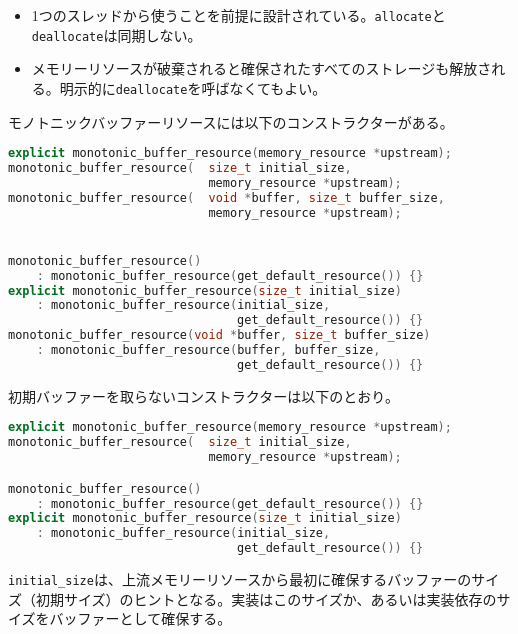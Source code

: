 \begin{itemize}[leftmargin=*]
\item
  1つのスレッドから使うことを前提に設計されている。\lstinline!allocate!と\lstinline!deallocate!は同期しない。
\item
  メモリーリソースが破棄されると確保されたすべてのストレージも解放される。明示的に\lstinline!deallocate!を呼ばなくてもよい。
\end{itemize}

%

モノトニックバッファーリソースには以下のコンストラクターがある。

\begin{lstlisting}[language=C++]
explicit monotonic_buffer_resource(memory_resource *upstream);
monotonic_buffer_resource(  size_t initial_size,
                            memory_resource *upstream);
monotonic_buffer_resource(  void *buffer, size_t buffer_size,
                            memory_resource *upstream);


monotonic_buffer_resource()
    : monotonic_buffer_resource(get_default_resource()) {}
explicit monotonic_buffer_resource(size_t initial_size)
    : monotonic_buffer_resource(initial_size,
                                get_default_resource()) {}
monotonic_buffer_resource(void *buffer, size_t buffer_size)
    : monotonic_buffer_resource(buffer, buffer_size,
                                get_default_resource()) {}
\end{lstlisting}

初期バッファーを取らないコンストラクターは以下のとおり。

\begin{lstlisting}[language=C++]
explicit monotonic_buffer_resource(memory_resource *upstream);
monotonic_buffer_resource(  size_t initial_size,
                            memory_resource *upstream);

monotonic_buffer_resource()
    : monotonic_buffer_resource(get_default_resource()) {}
explicit monotonic_buffer_resource(size_t initial_size)
    : monotonic_buffer_resource(initial_size,
                                get_default_resource()) {}
\end{lstlisting}

\lstinline!initial_size!は、上流メモリーリソースから最初に確保するバッファーのサイズ（初期サイズ）のヒントとなる。実装はこのサイズか、あるいは実装依存のサイズをバッファーとして確保する。

